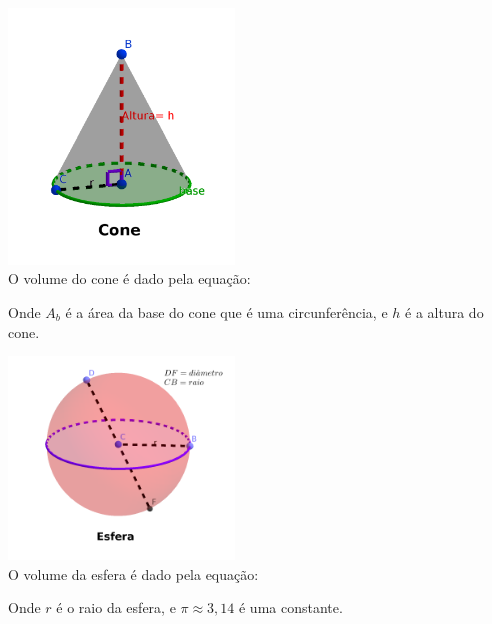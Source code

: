 \begin{multicols}{2}
 \includegraphics[width=6cm]{./cap_geometria/figs/cone} \\

 O volume do cone é dado pela equação:
 

 Onde $A_b$ é a área da base do cone que é uma circunferência, e $h$ é a altura do cone.
\end{multicols}

\begin{multicols}{2}
 \includegraphics[width=6cm]{./cap_geometria/figs/esfera} \\

 O volume da esfera é dado pela equação:
 
 
 Onde $r$ é o raio da esfera, e $\pi \approx 3,14$ é uma constante.
\end{multicols}
